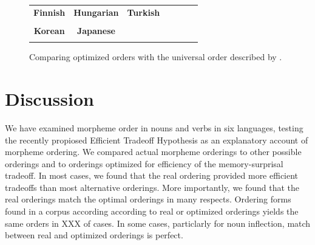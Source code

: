 \documentclass[11pt,letterpaper]{article}
\begin{document}
\begin{figure}
\begin{tabular}{ccccccc}
\textbf{Finnish} & \textbf{Hungarian} & \textbf{Turkish} \\
\begin{minipage}{.3\textwidth}
  
    \end{minipage}
    &
    \begin{minipage}{.3\textwidth}
  
    \end{minipage}
        &
    \begin{minipage}{.3\textwidth}
  
    \end{minipage} 
    \\
    \textbf{Korean} & \textbf{Japanese} \\
        \begin{minipage}{.3\textwidth}
  
    \end{minipage}
    &
    \begin{minipage}{.3\textwidth}
  
    \end{minipage}
\end{tabular}
    \caption{Comparing optimized orders with the universal order described by \citep{bybee-morphology-1985}.}
    \label{fig:my_label}
\end{figure}


\section{Discussion}

We have examined morpheme order in nouns and verbs in six languages, testing the recently propiosed Efficient Tradeoff Hypothesis \citep{hahn2020modeling} as an explanatory account of morpheme ordering.
We compared actual morpheme orderings to other possible orderings and to orderings optimized for efficiency of the memory-surprisal tradeoff.
In most cases, we found that the real ordering provided more efficient tradeoffs than most alternative orderings.
More importantly, we found that the real orderings match the optimal orderings in many respects.
Ordering forms found in a corpus according according to real or optimized orderings yields the same orders in XXX of cases.
In some cases, particlarly for noun inflection, match between real and optimized orderings is perfect.
\end{document}
